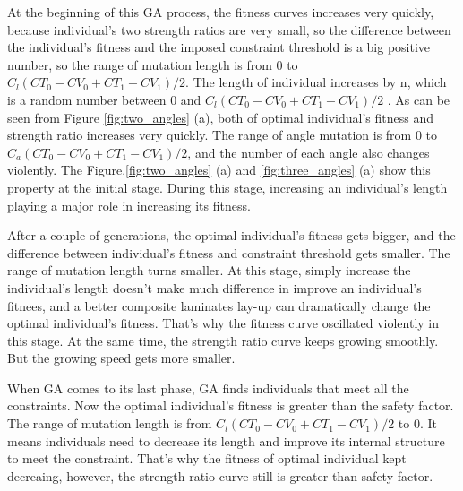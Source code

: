At the beginning of this GA process, the fitness curves increases very quickly,
because individual's two strength ratios are very small, so the difference
between the individual's fitness and the imposed constraint threshold is a big
positive number, so the range of mutation length is from 0 to $C_l(CT_0 - CV_0 +
CT_1 - CV_1)/2$.  The length of individual increases by n, which is a random
number between 0 and $C_l(CT_0 - CV_0 + CT_1 - CV_1)/2$ . As can be seen from
Figure \ref{fig:two_angles} (a), both of optimal individual's fitness and
strength ratio increases very quickly.  The range of angle mutation is from 0 to
$C_a(CT_0 - CV_0 + CT_1 - CV_1)/2$, and the number of each angle also changes
violently. The Figure.\ref{fig:two_angles} (a) and \ref{fig:three_angles} (a) show
this property at the initial stage.  During this stage, increasing an individual's length playing a
major role in increasing its fitness.

After a couple of generations, the optimal individual's fitness gets bigger, and
the difference between individual's fitness and constraint threshold gets
smaller. The range of mutation length turns smaller. At
this stage, simply increase the individual's length doesn't make much difference
in improve an individual's fitnees, and a better composite laminates lay-up can
dramatically change the optimal individual's fitness. That's why the fitness curve
oscillated violently in this stage.  At the same time, the strength ratio curve
keeps growing smoothly. But the growing speed gets more smaller.

When GA comes to its last phase, GA finds individuals that meet all the
constraints.  Now the optimal individual's fitness is greater than the safety
factor. The range of mutation length is from $C_l(CT_0 - CV_0 + CT_1 - CV_1)/2$
to 0. It means individuals need to decrease its length and improve its internal
structure to meet the constraint. That's why the fitness of optimal individual
kept decreaing, however, the strength ratio curve still is greater than safety
factor.

